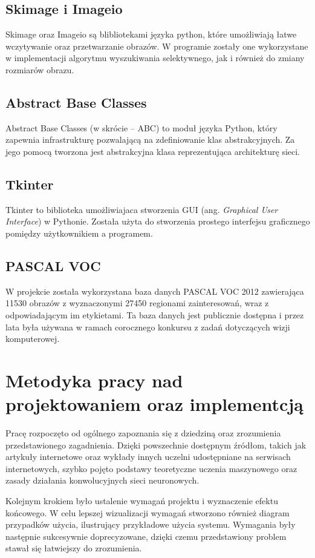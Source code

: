 \documentclass[a4paper,twoside,12pt]{book}
\newcommand{\obcy}[1]{\emph{#1}}
\newcommand{\ang}[1]{{\selectlanguage{british}\obcy{#1}}}
\begin{document}
{\subsection{Skimage i Imageio}
{Skimage oraz Imageio są blibliotekami języka python, które umożliwiają łatwe wczytywanie oraz przetwarzanie obrazów. W programie zostały one wykorzystane w implementacji algorytmu wyszukiwania selektywnego, jak i również do zmiany rozmiarów obrazu.}
\subsection{Abstract Base Classes}
{Abstract Base Classes (w skrócie – ABC) to moduł języka Python, który zapewnia infrastrukturę pozwalającą na zdefiniowanie klas abstrakcyjnych. Za jego pomocą tworzona jest abstrakcyjna klasa reprezentująca architekturę sieci. }
\subsection{Tkinter}
{Tkinter to biblioteka umożliwiajaca stworzenia GUI (ang. \ang{Graphical User Interface}) w Pythonie. Została użyta do stworzenia prostego interfejsu graficznego pomiędzy użytkownikiem a programem.}
\subsection{PASCAL VOC}
{W projekcie została wykorzystana baza danych PASCAL VOC 2012\cite{PASCAL} zawierająca 11530 obrazów z wyznaczonymi 27450 regionami zainteresowań, wraz z odpowiadającym im etykietami. Ta baza danych jest publicznie dostępna i przez lata była używana w ramach corocznego konkursu z zadań dotyczących wizji komputerowej.
}

\section{Metodyka pracy nad projektowaniem oraz implementcją}
{Pracę rozpoczęto od ogólnego zapoznania się z dziedziną oraz zrozumienia przedstawionego zagadnienia. Dzięki powszechnie dostępnym źródłom, takich jak artykuły internetowe oraz wykłady innych uczelni udostępniane na serwisach internetowych, szybko pojęto podstawy teoretyczne uczenia maszynowego oraz zasady działania konwolucyjnych sieci neuronowych.}

{Kolejnym krokiem było ustalenie wymagań projektu i wyznaczenie efektu końcowego. W celu lepszej wizualizacji wymagań stworzono również diagram przypadków użycia, ilustrujący przykładowe użycia systemu. Wymagania były następnie sukcesywnie  doprecyzowane, dzięki czemu przedstawiony problem stawał się łatwiejszy do zrozumienia.}

}
\end{document}
